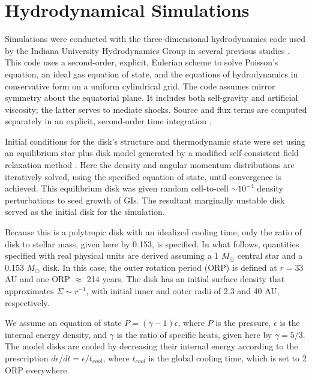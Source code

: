\documentclass[manuscript]{aastex}
\begin{document}
\section{Hydrodynamical Simulations}

Simulations were conducted with the three-dimensional hydrodynamics code used by the Indiana University Hydrodynamics Group in several previous studies \citep{pickett1998, pickett2000, mejiaphd2004, mejia2005, boley2006, cai2008}.  This code uses a second-order, explicit, Eulerian scheme to solve Poisson's equation, an ideal gas equation of state, and the equations of hydrodynamics in conservative form on a uniform cylindrical grid.  The code assumes mirror symmetry about the equatorial plane. It includes both self-gravity and artificial viscosity; the latter serves to 
mediate shocks. Source and flux terms \citep{norman1986} are computed separately in an explicit, second-order time integration \citep{albada1982,christodoulou1991,yangphd1992}.

Initial conditions for the disk's structure and thermodynamic state were set using an equilibrium star plus disk model generated by a modified \citet{hachisu1986} self-consistent field relaxation method \citep{pickett1996,pickett2003,mejiaphd2004,mejia2005,cai2006}. Here  the density and angular momentum distributions are iteratively solved, using the specified equation of state,  until convergence is achieved. This  equilibrium disk was 
given random cell-to-cell $\sim10^{-4}$ density perturbations to seed growth of  GIs.  The resultant marginally unstable disk served as the initial disk for the simulation.

Because this is a polytropic disk with an idealized cooling time, only the ratio of disk to stellar mass, given here by 0.153, is specified.  In what follows, quantities specified with real physical units are derived assuming a 1 $M_\odot$ central star and a 0.153  $M_\odot$ disk. In this case, the outer rotation period (ORP) is defined at $r = 33$ AU and one ORP $\approx$ 214 years.  The disk has an initial surface density that approximates $\Sigma \sim r^{ -1}$, with initial inner and outer radii of 2.3 and 40 AU, respectively. 

 We assume an equation of state $P = (\gamma -1)\epsilon$, where $P$ is the pressure, $\epsilon$ is the internal energy density, and $\gamma$ is the ratio of specific heats, given here by $\gamma = 5/3$.  The model disks are cooled by decreasing their internal energy according to the prescription $d\epsilon/dt = \epsilon / t_{cool}$, where $t_{cool}$ is the global cooling time, which is set to 2 ORP everywhere. 
 
\end{document}
